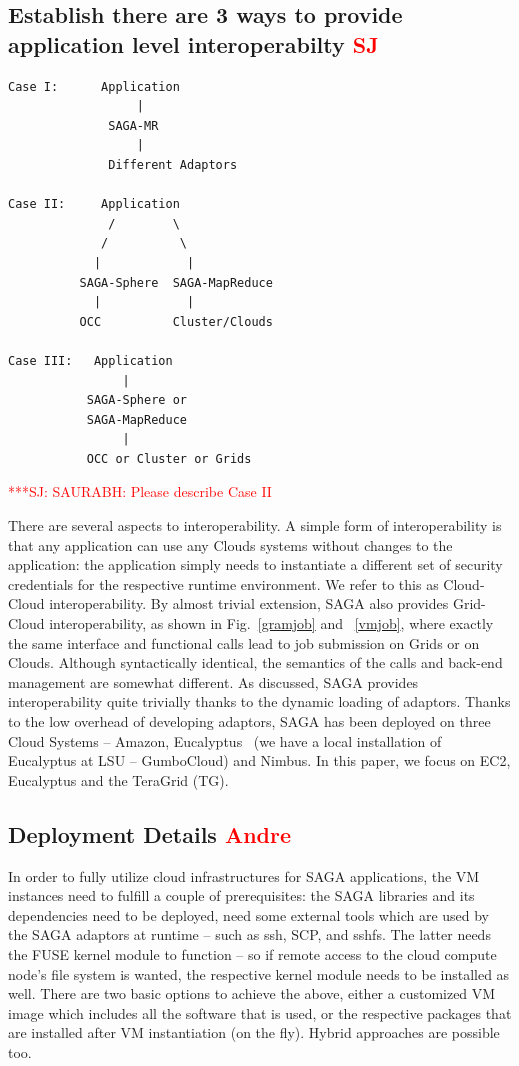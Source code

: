 \documentclass[3p,twocolumn]{elsarticle}
\newcommand{\jhanote}[1]{ {\textcolor{red} { ***SJ: #1 }}}
\newcommand{\jhanote}[1]{}
\begin{document}
\subsection{Establish there are 3 ways to provide application level
  interoperabilty \textcolor{red}{SJ}}

\begin{verbatim}
Case I:      Application 
                  |
              SAGA-MR
                  |
              Different Adaptors

Case II:     Application
              /        \
             /          \
            |            |
          SAGA-Sphere  SAGA-MapReduce
            |            |
          OCC          Cluster/Clouds
              
Case III:   Application
                |           
           SAGA-Sphere or 
           SAGA-MapReduce
                |
           OCC or Cluster or Grids
\end{verbatim}
            
\jhanote{SAURABH: Please describe Case II}


There are several aspects to interoperability. A simple form of
interoperability is that any application can use any Clouds systems
without changes to the application: the application simply needs to
instantiate a different set of security credentials for the respective
runtime environment. We refer to this as Cloud-Cloud
interoperability. By almost trivial extension, SAGA also provides
Grid-Cloud interoperability, as shown in Fig.~\ref{gramjob} and
~\ref{vmjob}, where exactly the same interface and functional calls
lead to job submission on Grids or on Clouds. Although syntactically
identical, the semantics of the calls and back-end management are
somewhat different.  As discussed, SAGA provides interoperability
quite trivially thanks to the dynamic loading of adaptors.  Thanks to
the low overhead of developing adaptors, SAGA has been deployed on
three Cloud Systems -- Amazon, Eucalyptus~\cite{eucalyptus} (we have a
local installation of Eucalyptus at LSU -- GumboCloud) and
Nimbus.  In this paper, we focus on EC2, Eucalyptus and the TeraGrid
(TG).

\subsection{Deployment Details \textcolor{red}{Andre}}

In order to fully utilize cloud infrastructures for SAGA applications,
the VM instances need to fulfill a couple of prerequisites: the SAGA
libraries and its dependencies need to be deployed, need some external
tools which are used by the SAGA adaptors at runtime -- such as ssh,
SCP, and sshfs.  The latter needs the FUSE kernel module to function
-- so if remote access to the cloud compute node's file system is
wanted, the respective kernel module needs to be installed as well.
There are two basic options to achieve the above, either a customized
VM image which includes all the software that is used, or the
respective packages that are installed after VM instantiation (on the
fly).  Hybrid approaches are possible too.
\end{document}
